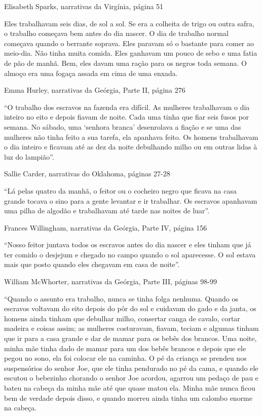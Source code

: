 Elisabeth Sparks, narrativas da Virgínia, página 51

Eles trabalhavam seis dias, de sol a sol. Se era a colheita de trigo ou
outra safra, o trabalho começava bem antes do dia nascer. O dia de
trabalho normal começava quando o berrante soprava. Eles paravam só o
bastante para comer ao meio-dia. Não tinha muita comida. Eles ganhavam
um pouco de sebo e uma fatia de pão de manhã. Bem, eles davam uma ração
para os negros toda semana. O almoço era uma fogaça assada em cima de
uma enxada.

Emma Hurley, narrativas da Geórgia, Parte II, página 276

``O trabalho dos escravos na fazenda era difícil. As mulheres
trabalhavam o dia inteiro no eito e depois fiavam de noite. Cada uma
tinha que fiar seis fusos por semana. No sábado, uma `senhora branca'
desenrolava a fiação e se uma das mulheres não tinha feito a sua tarefa,
ela apanhava feito. Os homens trabalhavam o dia inteiro e ficavam até as
dez da noite debulhando milho ou em outras lidas à luz do lampião''.

Sallie Carder, narrativas do Oklahoma, páginas 27-28

``Lá pelas quatro da manhã, o feitor ou o cocheiro negro que ficava na
casa grande tocava o sino para a gente levantar e ir trabalhar. Os
escravos apanhavam uma pilha de algodão e trabalhavam até tarde nas
noites de luar''.

Frances Willingham, narrativas da Geórgia, Parte IV, página 156

``Nosso feitor juntava todos os escravos antes do dia nascer e eles
tinham que já ter comido o desjejum e chegado no campo quando o sol
aparecesse. O sol estava mais que posto quando eles chegavam em casa de
noite''.

William McWhorter, narrativas da Geórgia, Parte III, páginas 98-99

``Quando o assunto era trabalho, nunca se tinha folga nenhuma. Quando os
escravos voltavam do eito depois do pôr do sol e cuidavam do gado e da
janta, os homens ainda tinham que debulhar milho, consertar canga de
cavalo, cortar madeira e coisas assim; as mulheres costuravam, fiavam,
teciam e algumas tinham que ir para a casa grande e dar de mamar para os
bebês dos brancos. Uma noite, minha mãe tinha dado de mamar para um dos
bebês brancos e depois que ele pegou no sono, ela foi colocar ele na
caminha. O pé da criança se prendeu nos suspensórios do senhor Joe, que
ele tinha pendurado no pé da cama, e quando ele escutou o bebezinho
chorando o senhor Joe acordou, agarrou um pedaço de pau e bateu na
cabeça da minha mãe até que quase matou ela. Minha mãe nunca ficou bem
de verdade depois disso, e quando morreu ainda tinha um calombo enorme
na cabeça.

